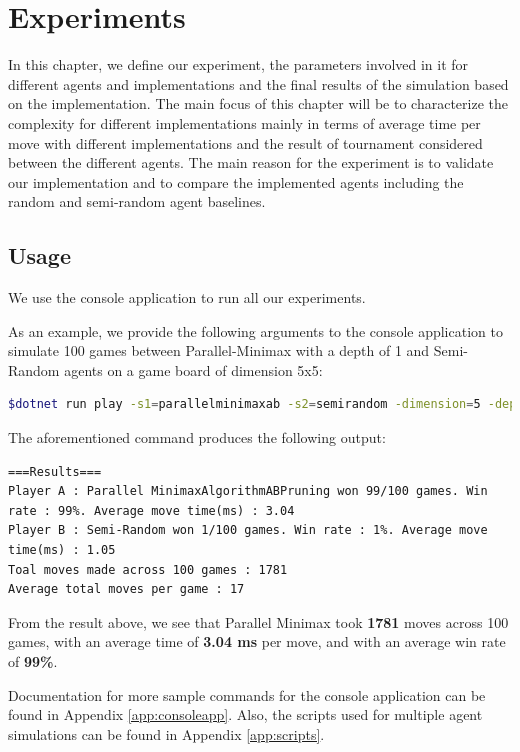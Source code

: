 \chapter{Experiments} \label{Experiments}

In this chapter, we define our experiment, the parameters involved in it for different agents and implementations and the final results of the simulation based on the implementation. The main focus of this chapter will be to characterize the complexity for different implementations mainly in terms of average time per move with different implementations and the result of tournament considered between the different agents. The main reason for the experiment is to validate our implementation and to compare the implemented agents including the random and semi-random agent baselines.

\section{Usage}

We use the console application to run all our experiments.

As an example, we provide the following arguments to the console application to simulate 100 games between Parallel-Minimax with a depth of 1 and Semi-Random agents on a game board of dimension 5x5:

\begin{lstlisting}[language=bash]
$dotnet run play -s1=parallelminimaxab -s2=semirandom -dimension=5 -depth=1 -sim -numsim=100
\end{lstlisting}

The aforementioned command produces the following output:

\begin{lstlisting}
===Results===
Player A : Parallel MinimaxAlgorithmABPruning won 99/100 games. Win rate : 99%. Average move time(ms) : 3.04
Player B : Semi-Random won 1/100 games. Win rate : 1%. Average move time(ms) : 1.05
Toal moves made across 100 games : 1781
Average total moves per game : 17
\end{lstlisting}

From the result above, we see that Parallel Minimax took \textbf{1781} moves across 100 games, with an average time of \textbf{3.04 ms} per move, and with an average win rate of \textbf{99\%}.

Documentation for more sample commands for the console application can be found in Appendix \ref{app:consoleapp}.
Also, the scripts used for multiple agent simulations can be found in Appendix \ref{app:scripts}.
 
